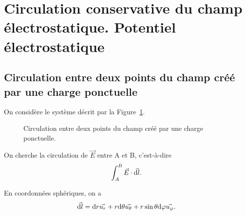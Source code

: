 \section{Circulation conservative du champ électrostatique. Potentiel électrostatique}

    \subsection{Circulation entre deux points du champ créé par une charge ponctuelle}

        On considère le système décrit par la Figure~\ref{fig:circulation_deux_points_champ_cree_charge_ponctuelle}.

        \begin{figure}
            \centering
            \caption{Circulation entre deux points du champ créé par une charge ponctuelle.}    
            \label{fig:circulation_deux_points_champ_cree_charge_ponctuelle}
        \end{figure}
        
        On cherche la circulation de $\vec{E}$ entre A et B, c'est-à-dire 
        \begin{equation*}
            \int_{A}^{B}\vec{E}\cdot\vec{\mathrm{d} l}.
        \end{equation*}

        En coordonnées sphériques, on a
        \begin{equation*}
            \vec{\mathrm{d} l}=\mathrm{d} r\vec{u_r}+r\mathrm{d}\theta\vec{u_{\theta}}+r\sin\theta\mathrm{d}\varphi\vec{u_{\varphi}}.
        \end{equation*}

